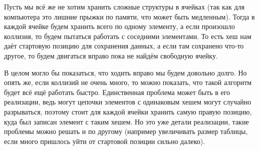 Пусть мы всё же не хотим хранить сложные структуры в ячейках (так как для компьютера это лишние прыжки по памяти, что может быть медленным). Тогда в каждой ячейке будем хранить всего по одному элементу, а если произошло коллизия, то будем пытаться работать с соседними элементами. То есть хеш нам даёт стартовую позицию для сохранения данных, а если там сохранено что-то другое, то будем двигаться вправо пока не найдём свободную ячейку.

В целом могло бы показаться, что ходить вправо мы будем довольно долго. Но опять же, если коллизий не очень много, то можно показать, что такой алгоритм будет всё ещё работать быстро. Единственная проблема может быть в его реализации, ведь могут цепочки элементов с одинаковым хешем могут случайно разрываться, поэтому стоит для каждой ячейки хранить самую правую позицию, куда был записан элемент с таким хешем. Но это уже детали реализации, такие проблемы можно решать и по другому (например увеличивать размер таблицы, если много пришлось уйти от стартовой позиции сильно далеко).

